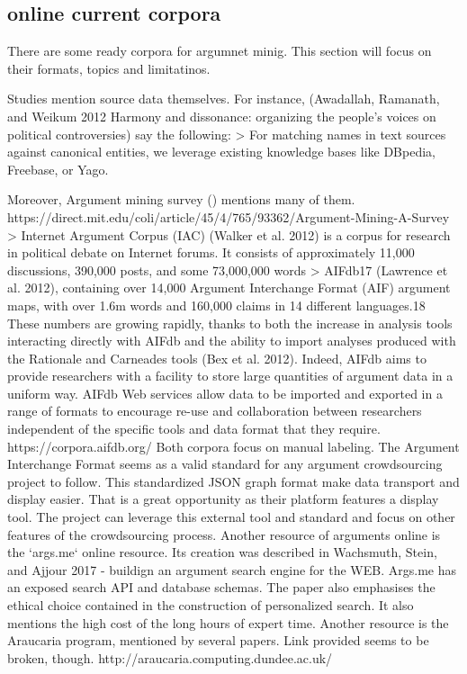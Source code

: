 \documentclass{article}
\begin{document}
\subsection{online current corpora}
There are some ready corpora for argumnet minig.
This section will focus on their formats, topics and limitatinos.

Studies mention source data themselves. 
For instance, (Awadallah, Ramanath, and Weikum 2012 Harmony and dissonance: organizing the people's voices on political controversies)
say the following:
> For matching names in text sources against canonical entities, we leverage existing knowledge bases like DBpedia, Freebase, or Yago.

Moreover, Argument mining survey () mentions many of them.
https://direct.mit.edu/coli/article/45/4/765/93362/Argument-Mining-A-Survey
> Internet Argument Corpus (IAC) (Walker et al. 2012) is a corpus for research in political debate on Internet forums. It consists of approximately 11,000 discussions, 390,000 posts, and some 73,000,000 words
> AIFdb17 (Lawrence et al. 2012), containing over 14,000 Argument Interchange Format (AIF) argument maps, with over 1.6m words and 160,000 claims in 14 different languages.18 These numbers are growing rapidly, thanks to both the increase in analysis tools interacting directly with AIFdb and the ability to import analyses produced with the Rationale and Carneades tools (Bex et al. 2012). Indeed, AIFdb aims to provide researchers with a facility to store large quantities of argument data in a uniform way. AIFdb Web services allow data to be imported and exported in a range of formats to encourage re-use and collaboration between researchers independent of the specific tools and data format that they require.
https://corpora.aifdb.org/
Both corpora focus on manual labeling.
The Argument Interchange Format seems as a valid standard for any argument crowdsourcing project to follow.
This standardized JSON graph format make data transport and display easier. That is a great opportunity as their platform features a display tool. 
The project can leverage this external tool and standard and focus on other features of the crowdsourcing process.
Another resource of arguments online is the `args.me` online resource. 
Its creation was described in Wachsmuth, Stein, and Ajjour 2017 - buildign an argument search engine for the WEB.
Args.me has an exposed search API and database schemas. The paper also emphasises the ethical choice contained in the construction of personalized search.
It also mentions the high cost of the long hours of expert time.
Another resource is the Araucaria program, mentioned by several papers. Link provided seems to be broken, though. http://araucaria.computing.dundee.ac.uk/
\end{document}
